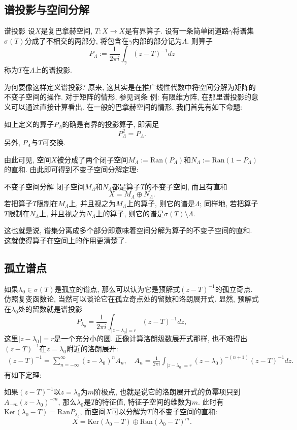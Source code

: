 

\subsection{谱投影与空间分解}
\begin{definition}{谱投影}
设$X$是复巴拿赫空间, $T:X\to X$是有界算子. 设有一条简单闭道路$\gamma$将谱集$\sigma(T)$分成了不相交的两部分, 将包含在$\gamma$内部的部分记为$\Lambda$. 则算子
$$
P_\Lambda:=\frac{1}{2\pi i}\int_\gamma(z-T)^{-1}dz
$$
称为$T$在$\Lambda$上的谱投影.
\end{definition}

为何要像这样定义谱投影? 原来, 这其实是在推广线性代数中将空间分解为矩阵的不变子空间的操作. 对于矩阵的情形, 参见词条 例: 有限维方阵, 在那里谱投影的意义可以通过直接计算看出. 在一般的巴拿赫空间的情形, 我们首先有如下命题:

\begin{lemma}{}
如上定义的算子$P_\Lambda$的确是有界的投影算子, 即满足
$$
P_\Lambda^2=P_\Lambda.
$$
另外, $P_\Lambda$与$T$可交换.
\end{lemma}

由此可见, 空间$X$被分成了两个闭子空间$M_\Lambda:=\text{Ran}(P_\Lambda)$和$N_\Lambda:=\text{Ran}(1-P_\Lambda)$的直和. 由此即可得到不变子空间分解定理:

\begin{theorem}{不变子空间分解}
闭子空间$M_\Lambda$和$N_\Lambda$都是算子$T$的不变子空间, 而且有直和
$$
X=M_\Lambda\oplus N_\Lambda.
$$
若把算子$T$限制在$M_\Lambda$上, 并且视之为$M_\Lambda$上的算子, 则它的谱是$\Lambda$; 同样地, 若把算子$T$限制在$N_\Lambda$上, 并且视之为$N_\Lambda$上的算子, 则它的谱是$\sigma(T)\setminus\Lambda$.
\end{theorem}

这也就是说, 谱集分离成多个部分即意味着空间分解为算子的不变子空间的直和. 这就使得算子在空间上的作用更清楚了.

\subsection{孤立谱点}
如果$\lambda_0\in\sigma(T)$是孤立的谱点, 那么可以认为它是预解式$(z-T)^{-1}$的孤立奇点. 仿照复变函数论, 当然可以谈论它在孤立奇点处的留数和洛朗展开式. 显然, 预解式在$\lambda_0$处的留数就是谱投影
$$
P_{\lambda_0}=\frac{1}{2\pi i}\int_{|z-\lambda_0|=r}(z-T)^{-1}dz,
$$
这里$|z-\lambda_0|=r$是一个充分小的圆. 正像计算洛朗级数展开式那样, 也不难得出$(z-T)^{-1}$在$z=\lambda_0$附近的洛朗展开:
$$
\begin{aligned}
(z-T)^{-1}
=\sum_{n=-\infty}^\infty(z-\lambda_0)^nA_n,
\quad
A_n=\frac{1}{2\pi i}\int_{|z-\lambda_0|=r}(z-\lambda_0)^{-(n+1)}(z-T)^{-1}dz.
\end{aligned}
$$
有如下定理:
\begin{theorem}{}
如果$(z-T)^{-1}$以$z=\lambda_0$为$m$阶极点, 也就是说它的洛朗展开式的负幂项只到$A_{-m}(z-\lambda_0)^{-m}$, 那么$\lambda_0$是$T$的特征值, 特征子空间的维数为$m$. 此时有$\text{Ker}(\lambda_0-T)=\text{Ran}P_{\lambda_0}$, 而空间$X$可以分解为$T$的不变子空间的直和:
$$
X=\text{Ker}(\lambda_0-T)\oplus \text{Ran}(\lambda_0-T)^m.
$$
\end{theorem}
